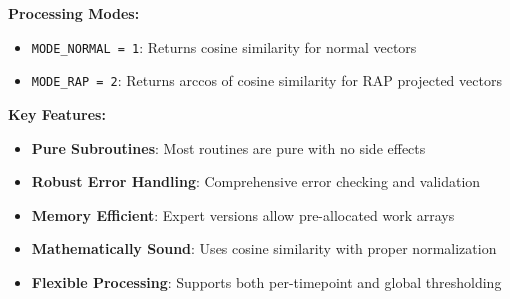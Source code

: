 \begin{enumerate}
          \textbf{Processing Modes:}
          \begin{itemize}
            \item \texttt{MODE\_NORMAL = 1}: Returns cosine similarity for normal vectors
                  
            \item \texttt{MODE\_RAP = 2}: Returns arccos of cosine similarity for RAP
                  projected vectors
          \end{itemize}
          
          \textbf{Key Features:}
          \begin{itemize}
            \item \textbf{Pure Subroutines}: Most routines are pure with no side effects
                  
            \item \textbf{Robust Error Handling}: Comprehensive error checking and validation
                  
            \item \textbf{Memory Efficient}: Expert versions allow pre-allocated work
                  arrays
                  
            \item \textbf{Mathematically Sound}: Uses cosine similarity with proper normalization
                  
            \item \textbf{Flexible Processing}: Supports both per-timepoint and global
                  thresholding
          \end{itemize}
\end{enumerate}